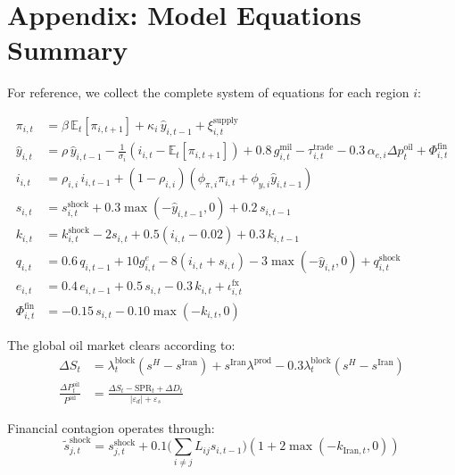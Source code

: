 \documentclass[12pt]{article}
\begin{document}

\newpage
\appendix
\section*{Appendix: Model Equations Summary}

For reference, we collect the complete system of equations for each region $i$:

\begin{align}
\pi_{i,t} &= \beta \, \mathbb{E}_t[\pi_{i,t+1}] + \kappa_i \, \hat{y}_{i,t-1} + \xi^{\text{supply}}_{i,t} \tag{A.1} \\[6pt]
\hat{y}_{i,t} &= \rho \, \hat{y}_{i,t-1} - \frac{1}{\sigma_i}(i_{i,t} - \mathbb{E}_t[\pi_{i,t+1}]) + 0.8 \, g^{\text{mil}}_{i,t} - \tau^{\text{trade}}_{i,t} - 0.3 \, \alpha_{e,i} \Delta p^{\text{oil}}_t + \Phi^{\text{fin}}_{i,t} \tag{A.2} \\[6pt]
i_{i,t} &= \rho_{i,i} \, i_{i,t-1} + (1-\rho_{i,i})(\phi_{\pi,i} \pi_{i,t} + \phi_{y,i} \hat{y}_{i,t-1}) \tag{A.3} \\[6pt]
s_{i,t} &= s^{\text{shock}}_{i,t} + 0.3 \max(-\hat{y}_{i,t-1}, 0) + 0.2 \, s_{i,t-1} \tag{A.4} \\[6pt]
k_{i,t} &= k^{\text{shock}}_{i,t} - 2 s_{i,t} + 0.5(i_{i,t} - 0.02) + 0.3 \, k_{i,t-1} \tag{A.5} \\[6pt]
q_{i,t} &= 0.6 \, q_{i,t-1} + 10 g^e_{i,t} - 8(i_{i,t} + s_{i,t}) - 3 \max(-\hat{y}_{i,t},0) + q^{\text{shock}}_{i,t} \tag{A.6} \\[6pt]
e_{i,t} &= 0.4 \, e_{i,t-1} + 0.5 \, s_{i,t} - 0.3 \, k_{i,t} + \iota^{\text{fx}}_{i,t} \tag{A.7} \\[6pt]
\Phi^{\text{fin}}_{i,t} &= -0.15 \, s_{i,t} - 0.10 \max(-k_{i,t}, 0) \tag{A.8}
\end{align}

The global oil market clears according to:
\begin{align}
\Delta S_t &= \lambda^{\text{block}}_t (s^H - s^{\text{Iran}}) + s^{\text{Iran}} \lambda^{\text{prod}} - 0.3 \lambda^{\text{block}}_t (s^H - s^{\text{Iran}}) \tag{A.9} \\[6pt]
\frac{\Delta P^{\text{oil}}_t}{P^{\text{oil}}} &= \frac{\Delta S_t - \text{SPR}_t + \Delta D_t}{|\varepsilon_d| + \varepsilon_s} \tag{A.10}
\end{align}

Financial contagion operates through:
\begin{equation}
\tilde{s}^{\text{shock}}_{j,t} = s^{\text{shock}}_{j,t} + 0.1 \Big(\textstyle\sum_{i \neq j} L_{ij} s_{i,t-1}\Big)(1 + 2\max(-k_{\text{Iran},t}, 0)) \tag{A.11}
\end{equation}
\end{document}
